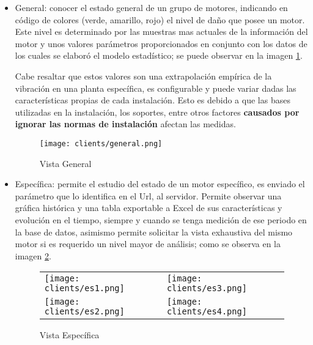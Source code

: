 \begin{itemize}
    \item General: conocer el estado general de un grupo de motores, indicando
        en código de colores (verde, amarillo, rojo) el nivel de daño que posee
        un motor. Este nivel es determinado por las muestras mas actuales de
        la información del motor y unos valores parámetros proporcionados en
        conjunto con los datos de los cuales se elaboró el modelo estadístico;
        se puede observar en la imagen \ref{img:VistaGeneral}.

        Cabe resaltar que estos valores son una extrapolación empírica de la
        vibración en una planta específica, es configurable y puede variar dadas
        las características propias de cada instalación. Esto es debido a que
        las bases utilizadas en la instalación, los soportes, entre otros factores
        \textbf{causados por ignorar las normas de instalación} afectan las medidas.

\begin{center}
    \begin{figure}[ht]
		\centering
        \caption{Vista General}
        \texttt{[image: clients/general.png]}
        \label{img:VistaGeneral}
	\end{figure}
\end{center}

    \item Específica:  permite el estudio del estado de un motor específico,
        es enviado el parámetro que lo identifica en el Url, al servidor.
        Permite observar
        una gráfica histórica y una tabla exportable a Excel de sus características y
        evolución en el tiempo, siempre y cuando se tenga medición de ese periodo
        en la base de datos, asimismo permite solicitar la vista exhaustiva del
        mismo motor si es requerido un nivel mayor de análisis;
        como se observa en la imagen \ref{img:VistaEspecifica}.

\begin{center}
    \begin{figure}[ht]
		\centering
        \caption{Vista Específica}
            \begin{tabular}{m{6cm}m{6cm}}
                \texttt{[image: clients/es1.png]}&
        \texttt{[image: clients/es3.png]}\\
                \texttt{[image: clients/es2.png]}&
        \texttt{[image: clients/es4.png]}
            \end{tabular}
        \label{img:VistaEspecifica}
	\end{figure}
\end{center}



\end{itemize}
